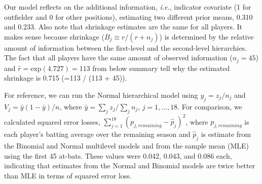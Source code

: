 \documentclass[article]{jss}
\begin{document}
Our model reflects on the additional information, \emph{i.e.}, indicator covariate (1 for outfielder and 0 for other positions), estimating two different prior means, 0.310 and 0.233. Also note that shrinkage estimates are the same for all players. It makes sense because shrinkage ($B_{j}\equiv r / (r+n_{j})$) is determined by the relative amount of information between the first-level and the second-level hierarchies. The fact that all players have the same amount of observed information ($n_{j}=45$) and $\hat{r}=\textrm{exp}(4.727)=113$ from below summary tell why the estimated shrinkage is 0.715 (=113 / (113 + 45)).


For reference, we can run the Normal hierarchical model using $y_{j}=z_{j} / n_{j}$ and $V_{j}=\bar{y}(1-\bar{y})/n$, where $\bar{y}=\sum_{j} z_{j} / \sum_{j} n_{j}$, $j=1,\ldots, 18$. For comparison, we calculated squared error losses, $\sum_{j=1}^{18}(p_{j, remaining}-\hat{p}_{j})^{2}$, where $p_{j, remaining}$ is each player's batting average over the remaining season and $\hat{p}_{j}$ is estimate from the Binomial and Normal multilevel models and from the sample mean (MLE) using the first 45 at-bats. These values were 0.042, 0.043, and 0.086 each, indicating that estimates from the Normal and Binomial models are twice better than MLE in terms of squared error loss. 
\end{document}
